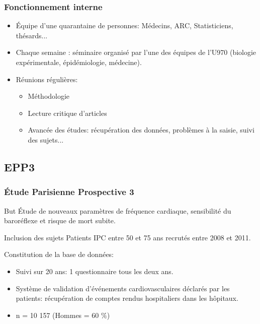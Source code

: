 \documentclass{beamer}
\begin{document}
\begin{frame}
\frametitle{Fonctionnement interne}

\begin{itemize}
\pause
\item Équipe d'une quarantaine de personnes: Médecins, ARC, Statisticiens, thésards...
\pause
\item Chaque semaine : séminaire organisé par l'une des équipes de l'U970 (biologie expérimentale, épidémiologie, médecine).
\pause
\item Réunions régulières: 
\begin{itemize}
\pause
\item Méthodologie
\pause
\item Lecture critique d'articles
\pause
\item Avancée des études: récupération des données, problèmes à la saisie, suivi des sujets...
\end{itemize}
\end{itemize}
\end{frame}


\subsection{EPP3}
\begin{frame}
\frametitle{Étude Parisienne Prospective 3}

\pause
\begin{beamerboxesrounded}[upper = titre, lower = texte, shadow = true]{But}
\pause
Étude de nouveaux paramètres de fréquence cardiaque, sensibilité du baroréflexe et risque de mort subite.
\end{beamerboxesrounded}

\pause
\begin{beamerboxesrounded}[upper = titre, lower = texte, shadow = true]{Inclusion des sujets}
\pause
Patients IPC entre 50 et 75 ans recrutés entre 2008 et 2011.
\end{beamerboxesrounded}

\pause
Constitution de la base de données:\\
\begin{itemize}
\pause
\item Suivi sur 20 ans: 1 questionnaire tous les deux ans.
\pause
\item Système de validation d'événements cardiovasculaires déclarés par les patients: récupération de comptes rendus hospitaliers dans les hôpitaux.
\pause
\item n = 10 157 (Hommes = 60 $\%$)
\end{itemize}
\end{frame}
\end{document}
